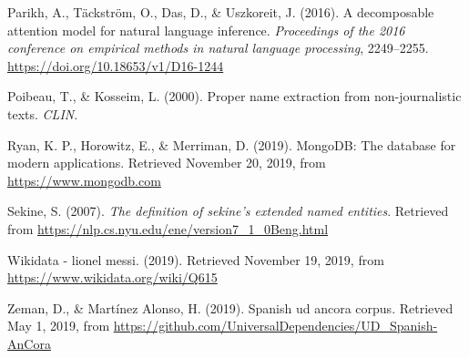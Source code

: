 \documentclass[12pt,a4paper,]{scrartcl}
\begin{document}
\leavevmode\hypertarget{ref-parikh-etal-2016-decomposable}{}%
Parikh, A., Täckström, O., Das, D., \& Uszkoreit, J. (2016). A decomposable attention model for natural language inference. \emph{Proceedings of the 2016 conference on empirical methods in natural language processing}, 2249--2255. \url{https://doi.org/10.18653/v1/D16-1244}

\leavevmode\hypertarget{ref-Poibeau2000ProperNE}{}%
Poibeau, T., \& Kosseim, L. (2000). Proper name extraction from non-journalistic texts. \emph{CLIN}.

\leavevmode\hypertarget{ref-mongodb}{}%
Ryan, K. P., Horowitz, E., \& Merriman, D. (2019). MongoDB: The database for modern applications. Retrieved November 20, 2019, from \url{https://www.mongodb.com}

\leavevmode\hypertarget{ref-Sekine-NER}{}%
Sekine, S. (2007). \emph{The definition of sekine's extended named entities}. Retrieved from \url{https://nlp.cs.nyu.edu/ene/version7_1_0Beng.html}

\leavevmode\hypertarget{ref-wikidata_messi}{}%
Wikidata - lionel messi. (2019). Retrieved November 19, 2019, from \url{https://www.wikidata.org/wiki/Q615}

\leavevmode\hypertarget{ref-ancora-es}{}%
Zeman, D., \& Martínez Alonso, H. (2019). Spanish ud ancora corpus. Retrieved May 1, 2019, from \url{https://github.com/UniversalDependencies/UD_Spanish-AnCora}
\end{document}
